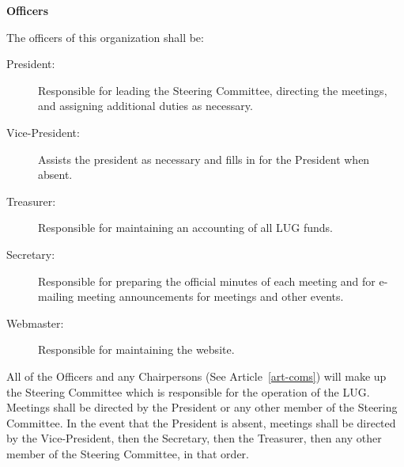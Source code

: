 \bigskip
\begin{art} {\bf Officers}
\label{art-off}

\begin{sect}
The officers of this organization shall be:
\begin{description}
\item[\hspace*{0.25in} President:]
Responsible for leading the Steering Committee, directing 
the meetings, and assigning additional duties as necessary.
\item[\hspace*{0.25in} Vice-President:]
Assists the president as necessary and fills in for the President when
absent.
\item[\hspace*{0.25in} Treasurer:]
Responsible for maintaining an accounting of all LUG funds.
\item[\hspace*{0.25in} Secretary:]
Responsible for preparing the official minutes of each meeting and
for e-mailing meeting announcements for meetings and other events.
\item[\hspace*{0.25in} Webmaster:]
Responsible for maintaining the website.
\end{description}
All of the Officers and any Chairpersons (See Article~\ref{art-coms}) will make up the Steering Committee which is responsible for the operation of the LUG.
Meetings shall be directed by the President or any other member of the Steering Committee.  In the event that the President is absent, meetings shall be directed by the Vice-President, then the Secretary, then the Treasurer, then any other member of the Steering Committee, in that order.

\end{sect}


\end{art}
